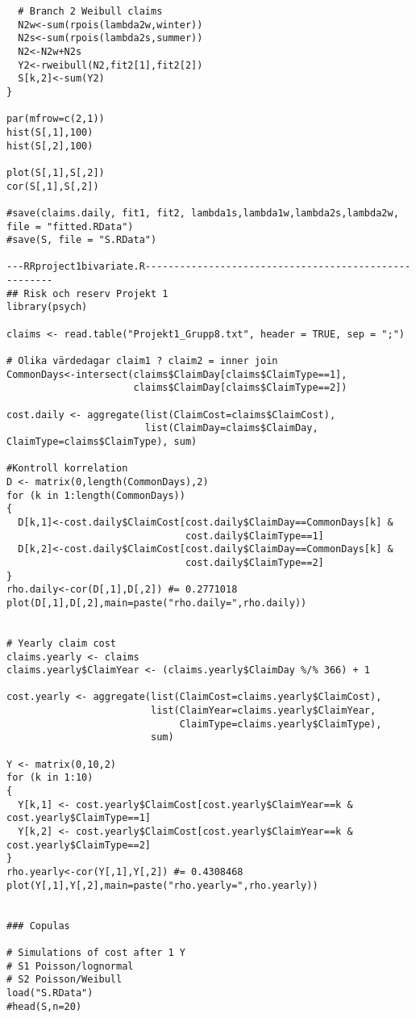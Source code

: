 \documentclass[11pt]{article}
\begin{document}
\begin{verbatim}
  # Branch 2 Weibull claims
  N2w<-sum(rpois(lambda2w,winter))
  N2s<-sum(rpois(lambda2s,summer))
  N2<-N2w+N2s
  Y2<-rweibull(N2,fit2[1],fit2[2])
  S[k,2]<-sum(Y2)
}

par(mfrow=c(2,1))
hist(S[,1],100)
hist(S[,2],100)

plot(S[,1],S[,2])
cor(S[,1],S[,2])

#save(claims.daily, fit1, fit2, lambda1s,lambda1w,lambda2s,lambda2w, file = "fitted.RData")
#save(S, file = "S.RData")

---RRproject1bivariate.R------------------------------------------------------
## Risk och reserv Projekt 1
library(psych)

claims <- read.table("Projekt1_Grupp8.txt", header = TRUE, sep = ";")

# Olika värdedagar claim1 ? claim2 = inner join
CommonDays<-intersect(claims$ClaimDay[claims$ClaimType==1],
                      claims$ClaimDay[claims$ClaimType==2])

cost.daily <- aggregate(list(ClaimCost=claims$ClaimCost),
                        list(ClaimDay=claims$ClaimDay, ClaimType=claims$ClaimType), sum)

#Kontroll korrelation
D <- matrix(0,length(CommonDays),2)
for (k in 1:length(CommonDays))
{
  D[k,1]<-cost.daily$ClaimCost[cost.daily$ClaimDay==CommonDays[k] &
                               cost.daily$ClaimType==1]
  D[k,2]<-cost.daily$ClaimCost[cost.daily$ClaimDay==CommonDays[k] &
                               cost.daily$ClaimType==2]
}
rho.daily<-cor(D[,1],D[,2]) #= 0.2771018
plot(D[,1],D[,2],main=paste("rho.daily=",rho.daily))


# Yearly claim cost
claims.yearly <- claims
claims.yearly$ClaimYear <- (claims.yearly$ClaimDay %/% 366) + 1

cost.yearly <- aggregate(list(ClaimCost=claims.yearly$ClaimCost),
                         list(ClaimYear=claims.yearly$ClaimYear,
                              ClaimType=claims.yearly$ClaimType),
                         sum)

Y <- matrix(0,10,2)
for (k in 1:10)
{
  Y[k,1] <- cost.yearly$ClaimCost[cost.yearly$ClaimYear==k & cost.yearly$ClaimType==1]
  Y[k,2] <- cost.yearly$ClaimCost[cost.yearly$ClaimYear==k & cost.yearly$ClaimType==2]
}
rho.yearly<-cor(Y[,1],Y[,2]) #= 0.4308468
plot(Y[,1],Y[,2],main=paste("rho.yearly=",rho.yearly))


### Copulas

# Simulations of cost after 1 Y
# S1 Poisson/lognormal
# S2 Poisson/Weibull
load("S.RData")
#head(S,n=20)



\end{verbatim}
\end{document}
